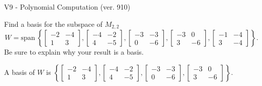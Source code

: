 \begin{exercise}
  \begin{exerciseTitle}V9 - Polynomial Computation (ver. 910)\end{exerciseTitle}
  \begin{exerciseStatement}
    Find a basis for the subspace of \(M_{2,2}\) 
\[W=\mathrm{span}\ \left\{\left[\begin{array}{cc}
-2 & -4 \\
1 & 3
\end{array}\right] , \left[\begin{array}{cc}
-4 & -2 \\
4 & -5
\end{array}\right] , \left[\begin{array}{cc}
-3 & -3 \\
0 & -6
\end{array}\right] , \left[\begin{array}{cc}
-3 & 0 \\
3 & -6
\end{array}\right] , \left[\begin{array}{cc}
-1 & -4 \\
3 & -4
\end{array}\right]\right\}.\]
 Be sure to explain why your result is a basis.


  \end{exerciseStatement}
  \begin{exerciseAnswer}
   A basis of \(W\) is  \(\left\{\left[\begin{array}{cc}
-2 & -4 \\
1 & 3
\end{array}\right] , \left[\begin{array}{cc}
-4 & -2 \\
4 & -5
\end{array}\right] , \left[\begin{array}{cc}
-3 & -3 \\
0 & -6
\end{array}\right] , \left[\begin{array}{cc}
-3 & 0 \\
3 & -6
\end{array}\right]\right\}\).
  


  \end{exerciseAnswer}
\end{exercise}